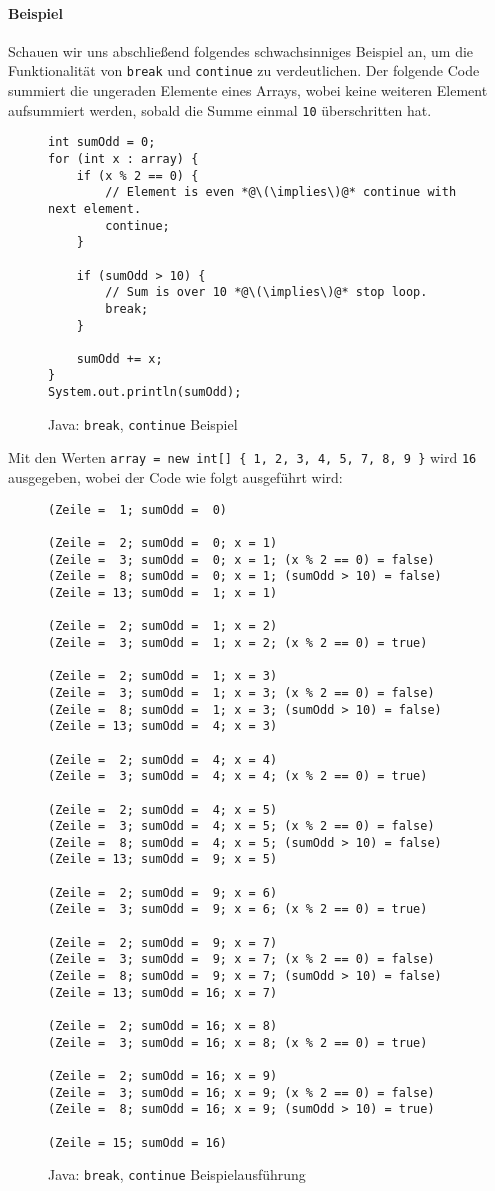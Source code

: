 		\paragraph{Beispiel}
			Schauen wir uns abschließend folgendes schwachsinniges Beispiel an, um die Funktionalität von \texttt{break} und \texttt{continue} zu verdeutlichen. Der folgende Code summiert die ungeraden Elemente eines Arrays, wobei keine weiteren Element aufsummiert werden, sobald die Summe einmal \texttt{10} überschritten hat.
			\begin{figure}[H]
				\centering
				\begin{lstlisting}
int sumOdd = 0;
for (int x : array) {
	if (x % 2 == 0) {
		// Element is even *@\(\implies\)@* continue with next element.
		continue;
	}

	if (sumOdd > 10) {
		// Sum is over 10 *@\(\implies\)@* stop loop.
		break;
	}

	sumOdd += x;
}
System.out.println(sumOdd);
				\end{lstlisting}
				\caption{Java: \texttt{break}, \texttt{continue} Beispiel}
			\end{figure}
			Mit den Werten \texttt{array = new int[] \{ 1, 2, 3, 4, 5, 7, 8, 9 \}} wird \texttt{16} ausgegeben, wobei der Code wie folgt ausgeführt wird:
			\begin{figure}[H]
				\centering
				\begin{lstlisting}
(Zeile =  1; sumOdd =  0)

(Zeile =  2; sumOdd =  0; x = 1)
(Zeile =  3; sumOdd =  0; x = 1; (x % 2 == 0) = false)
(Zeile =  8; sumOdd =  0; x = 1; (sumOdd > 10) = false)
(Zeile = 13; sumOdd =  1; x = 1)

(Zeile =  2; sumOdd =  1; x = 2)
(Zeile =  3; sumOdd =  1; x = 2; (x % 2 == 0) = true)

(Zeile =  2; sumOdd =  1; x = 3)
(Zeile =  3; sumOdd =  1; x = 3; (x % 2 == 0) = false)
(Zeile =  8; sumOdd =  1; x = 3; (sumOdd > 10) = false)
(Zeile = 13; sumOdd =  4; x = 3)

(Zeile =  2; sumOdd =  4; x = 4)
(Zeile =  3; sumOdd =  4; x = 4; (x % 2 == 0) = true)

(Zeile =  2; sumOdd =  4; x = 5)
(Zeile =  3; sumOdd =  4; x = 5; (x % 2 == 0) = false)
(Zeile =  8; sumOdd =  4; x = 5; (sumOdd > 10) = false)
(Zeile = 13; sumOdd =  9; x = 5)

(Zeile =  2; sumOdd =  9; x = 6)
(Zeile =  3; sumOdd =  9; x = 6; (x % 2 == 0) = true)

(Zeile =  2; sumOdd =  9; x = 7)
(Zeile =  3; sumOdd =  9; x = 7; (x % 2 == 0) = false)
(Zeile =  8; sumOdd =  9; x = 7; (sumOdd > 10) = false)
(Zeile = 13; sumOdd = 16; x = 7)

(Zeile =  2; sumOdd = 16; x = 8)
(Zeile =  3; sumOdd = 16; x = 8; (x % 2 == 0) = true)

(Zeile =  2; sumOdd = 16; x = 9)
(Zeile =  3; sumOdd = 16; x = 9; (x % 2 == 0) = false)
(Zeile =  8; sumOdd = 16; x = 9; (sumOdd > 10) = true)

(Zeile = 15; sumOdd = 16)
				\end{lstlisting}
				\caption{Java: \texttt{break}, \texttt{continue} Beispielausführung}
			\end{figure}
